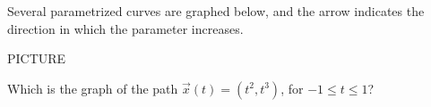 \begin{problem}
Several parametrized curves are graphed below, and the arrow indicates the direction in which the parameter increases.

PICTURE

Which is the graph of the path $\vec{x}(t) = (t^2, t^3)$, for $-1\leq t\leq 1$?
\begin{multipleChoice}
\end{multipleChoice}
\end{problem}